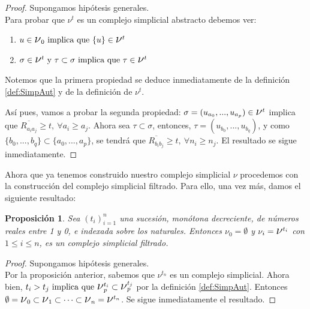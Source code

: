 \documentclass[12pt, a4paper, twoside]{book}
\numberwithin{equation}{section}
\theoremstyle{definition}
\theoremstyle{remark}
\theoremstyle{plain}
\newtheorem{prop}{Proposición}
\begin{document}
	\begin{proof}
		Supongamos hipótesis generales. \\
		Para probar que {\Large $\nu$}$^{t}$ es un complejo simplicial 
		abstracto debemos ver: 
		\begin{enumerate}
			\item $u \in \text{{\Large $\nu$}}_{0} \text{ implica 
				que } \{u\} \in \text{{\Large $\nu$}}^{t}$
			\item $ \sigma \in \text{{\Large $\nu$}}^{t} 
				\text{ y } \tau \subset \sigma \text{ implica 
				que } \tau \in \text{{\Large $\nu$}}^{t}$	
		\end{enumerate}
		Notemos que la primera propiedad se deduce inmediatamente de 
		la definición \ref{def:SimpAut} y de la definición de 
		{\Large $\nu$}$^{t}$.

		Así pues, vamos a probar la segunda propiedad:
		$\sigma=(u_{a_{0}},...,u_{a_{p}}) \in 
		\text{{\Large $\nu$}}^{t}$ 
		 implica que $\overline{R_{a_{i}a_{j}}}\geq t, \  
		\forall a_{i} \geq a_{j}$. 
		Ahora sea $\tau \subset \sigma$, entonces, 
		$\tau = (u_{b_{0}},...,u_{b_{q}})$, y como $\{b_{0},...,
		b_{q}\} 
		\subset \{a_{0},...,a_{p}\}$, se tendrá que 
		$\overline{R_{b_{i}b_{j}}} \geq t,\ \forall n_{i} \geq n_{j}$. 
		El resultado se sigue inmediatamente. 
	\end{proof}

	Ahora que ya tenemos construido nuestro complejo simplicial 
	{\Large $\nu$} procedemos con la construcción del complejo simplicial 
	filtrado. Para ello, una vez más, damos el siguiente resultado:

	\begin{prop}
		Sea $(t_{i})_{i=1}^{n}$ una sucesión, monótona decreciente, 
		de números reales entre 1 y 0, e indexada sobre los naturales. 
		Entonces {\Large $\nu$}$_{0}=\emptyset$ y {\Large $\nu$}$_{i}=
		\text{{\Large $\nu$}}^{t_{i}}$ con $1\leq i \leq n$, es un 
		complejo simplicial filtrado.   
	\end{prop}

	\begin{proof}
		Supongamos hipótesis generales.\\
		Por la proposición anterior, sabemos que 
		{\Large $\nu$}$^{t_{n}}$ es un complejo simplicial. Ahora 
		bien, $t_{i} > t_{j} \text{ implica que } 
		\text{{\Large $\nu$}}_{p}^{t_{i}} \subset 
		\text{{\Large $\nu$}}_{p}^{t_{j}}$ por la definición 
		\ref{def:SimpAut}. Entonces 
		$\emptyset=\text{{\Large $\nu$}}_{0} 
		\subset \text{{\Large $\nu$}}_{1} \subset \cdots \subset 
		\text{{\Large $\nu$}}_{n}=\text{{\Large $\nu$}}^{t_{n}}$. Se 
		sigue inmediatamente el resultado.
	\end{proof}
\end{document}
